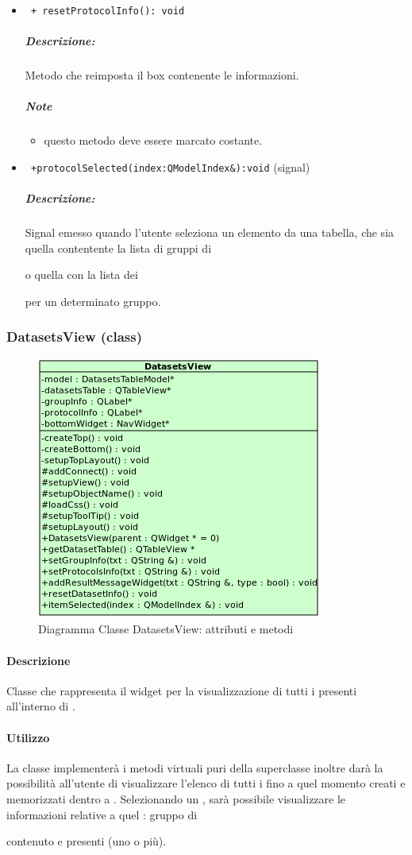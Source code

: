 \begin{itemize}
\item\color{blue}\verb! + resetProtocolInfo(): void!
\color{black}
\subparagraph{Descrizione:}Metodo che reimposta il box contenente le informazioni.
 \subparagraph{Note}
 \begin{itemize}
 \item questo metodo deve essere marcato costante.
 \end{itemize}

\item\color{blue}\verb! +protocolSelected(index:QModelIndex&):void! (signal)
\color{black} 
\subparagraph{Descrizione:}
Signal\g{} emesso quando l'utente seleziona un elemento da una tabella, che sia quella contentente la lista di gruppi di \subject{} o quella con la lista dei \subject{} per un determinato gruppo.

\end{itemize}
\color{black}
\pagebreak
\subsubsection{DatasetsView (class)}
\label{spedatV}
\begin{figure}[!h]
\centering
			\includegraphics[width=0.5\linewidth]{./Content/Immagini/view/DatasetsView.png}
			\caption{Diagramma Classe DatasetsView: attributi e metodi}
			\label{cl_datview}
\end{figure}
\paragraph{Descrizione \\}
Classe che rappresenta il widget per la visualizzazione di tutti i \dataset{} presenti all'interno di \project.
\paragraph{Utilizzo\\}
La classe implementerà i metodi virtuali puri della superclasse inoltre darà la possibilità all'utente di visualizzare l'elenco di tutti i \dataset{} fino a quel momento creati e memorizzati dentro a \project. Selezionando un \dataset{}, sarà possibile visualizzare le informazioni relative a quel \dataset{}: gruppo di \subject{} contenuto e \protocol{} presenti (uno o più).

